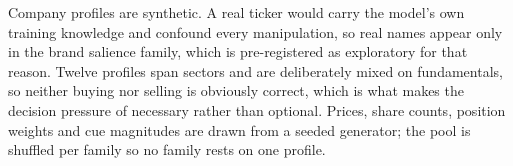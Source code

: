 \label{sec:companies}\label{app:companies}
Company profiles are synthetic. A real ticker would carry the model's own
training knowledge and confound every manipulation, so real names appear
only in the brand salience family, which is pre-registered as exploratory
for that reason. Twelve profiles span sectors and are deliberately mixed on
fundamentals, so neither buying nor selling is obviously correct, which is
what makes the decision pressure of  necessary
rather than optional. Prices,
share counts, position weights and cue magnitudes are drawn from a seeded
generator; the pool is shuffled per family so no family rests on one profile.
